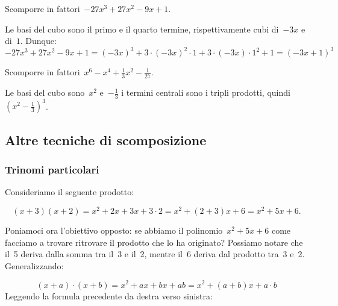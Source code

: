  \begin{esempio}
Scomporre in fattori~\(-27x^{3}+27x^{2}-9x+1\).

Le basi del cubo sono il primo e il quarto termine, rispettivamente cubi 
di~\(-3x\) e di~\(1\).
Dunque:
\[-27x^{3}+27x^{2}-9x+1=
  (-3x)^{3}+3\cdot (-3x)^{2}\cdot 1+3\cdot (-3x)\cdot 1^{2}+1=(-3x+1)^{3}\]
 \end{esempio}

 \begin{esempio}
Scomporre in fattori~\(x^{6}-x^{4}+\frac{1}{3}x^{2}-\frac{1}{27}\).

Le basi del cubo sono~\(x^{2}\) e~\(-\frac{1}{3}\) i termini centrali sono i 
tripli prodotti, quindi~\(\left(x^{2}-\frac{1}{3}\right)^{3}\).
\end{esempio}





\subsection{Altre tecniche di scomposizione}
\label{subsec:divpol_altretecniche}

\subsubsection{Trinomi particolari}
\label{subsubsec:trinpart}

Consideriamo il seguente prodotto:

\[(x+3)(x+2)=x^{2}+2x+3x+3 \cdot 2=x^{2}+(2+3)x+6=x^{2}+5x+6.\]

Poniamoci ora l'obiettivo opposto: se abbiamo il
polinomio~\(x^{2}+5x+6\) come facciamo a trovare ritrovare il prodotto
che lo ha originato? Possiamo notare che il~5 deriva dalla somma tra
il~3 e il~2, mentre il~6 deriva dal prodotto tra~3 e~2. Generalizzando:

\[\left(x+a\right)\cdot \left(x+b\right)=
  x^{{2}}+ax+bx+ab=x^{2}+\left(a+b\right)x+a\cdot b\]
Leggendo la formula precedente da destra verso sinistra:

